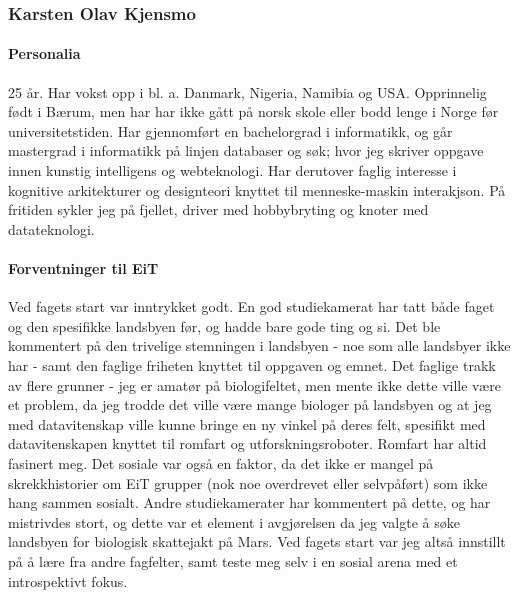 \subsubsection{Karsten Olav Kjensmo}

\paragraph{Personalia}
25 år. Har vokst opp i bl. a. Danmark, Nigeria, Namibia og USA. Opprinnelig født i Bærum, men har har ikke gått på norsk skole eller bodd lenge i Norge før universitetstiden. Har gjennomført en bachelorgrad i informatikk, og går mastergrad i informatikk på linjen databaser og søk; hvor jeg skriver oppgave innen kunstig intelligens og webteknologi. Har derutover faglig interesse i kognitive arkitekturer og designteori knyttet til menneske-maskin interakjson. På fritiden sykler jeg på fjellet, driver med hobbybryting og knoter med datateknologi. 

\paragraph{Forventninger til EiT}
Ved fagets start var inntrykket godt. En god studiekamerat har tatt både faget og den spesifikke landsbyen før, og hadde bare gode ting og si. Det ble kommentert på den trivelige stemningen i landsbyen - noe som alle landsbyer ikke har - samt den faglige friheten knyttet til oppgaven og emnet. Det faglige trakk av flere grunner - jeg er amatør på biologifeltet, men mente ikke dette ville være et problem, da jeg trodde det ville være mange biologer på landsbyen og at jeg med datavitenskap ville kunne bringe en ny vinkel på deres felt, spesifikt med datavitenskapen knyttet til romfart og utforskningsroboter. Romfart har altid fasinert meg. Det sosiale var også en faktor, da det ikke er mangel på skrekkhistorier om EiT grupper (nok noe overdrevet eller selvpåført) som ikke hang sammen sosialt. Andre studiekamerater har kommentert på dette, og har mistrivdes stort, og dette var et element i avgjørelsen da jeg valgte å søke landsbyen for biologisk skattejakt på Mars. Ved fagets start var jeg altså innstillt på å lære fra andre fagfelter, samt teste meg selv i en sosial arena med et introspektivt fokus. 




